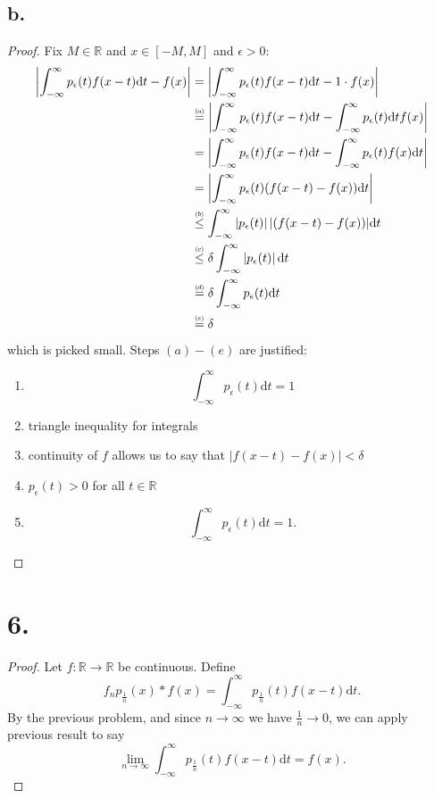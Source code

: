 \documentclass{article}
\newcommand\numeq[1]%
  {\stackrel{\scriptscriptstyle(\mkern-1.5mu#1\mkern-1.5mu)}{=}}
\newcommand\numleq[1]
  {\stackrel{\scriptscriptstyle(\mkern-1.5mu#1\mkern-1.5mu)}{\leq}}
\begin{document}
\subsection*{b.}
\begin{proof}
  Fix $M \in \mathbb{R}$ and $x \in [-M, M]$ and $\epsilon > 0$:
  \begin{align*}
    \left|\int_{-\infty}^{\infty}p_{\epsilon}(t)f(x - t)\mathrm{d}t - f(x) \right| &= \left|\int_{-\infty}^{\infty}p_{\epsilon}(t)f(x - t)\mathrm{d}t - 1 \cdot f(x) \right| \\
    &\numeq{a} \left|\int_{-\infty}^{\infty}p_{\epsilon}(t)f(x - t)\mathrm{d}t - \int_{-\infty}^{\infty}p_{\epsilon}(t)\mathrm{d}t f(x) \right|\\
    &= \left|\int_{-\infty}^{\infty}p_{\epsilon}(t)f(x - t)\mathrm{d}t - \int_{-\infty}^{\infty}p_{\epsilon}(t)f(x)\mathrm{d}t \right| \\
    &= \left|\int_{-\infty}^{\infty}p_{\epsilon}(t)(f(x - t) - f(x))\mathrm{d}t \right| \\
    &\numleq{b}\int_{-\infty}^{\infty}\left|p_{\epsilon}(t)\right||(f(x - t) - f(x))|\mathrm{d}t\\
    &\numleq{c}\delta \int_{-\infty}^{\infty}\left|p_{\epsilon}(t)\right|\mathrm{d}t \\
    &\numeq{d} \delta \int_{-\infty}^{\infty}p_{\epsilon}(t)\mathrm{d}t \\
    &\numeq{e}\delta
  \end{align*}
  which is picked small. Steps $(a)-(e)$ are justified:
  \begin{enumerate}[\indent(a)]
    \item \[
    \int_{-\infty}^{\infty}p_{\epsilon}(t) \mathrm{d}t = 1  
    \]
    \item triangle inequality for integrals
    \item continuity of $f$ allows us to say that $|f(x - t) - f(x)| < \delta$
    \item $p_{\epsilon}(t) > 0$ for all $t \in \mathbb{R}$
    \item \[
      \int_{-\infty}^{\infty}p_{\epsilon}(t) \mathrm{d}t = 1.
    \]
  \end{enumerate}
\end{proof}
\section*{6.}
\begin{proof}
  Let $f:\mathbb{R} \to \mathbb{R}$ be continuous. Define 
  \[
  f_n p_{\frac{1}{n}}(x)*f(x) = \int_{-\infty}^{\infty}p_{\frac{1}{n}}(t)f(x - t)\mathrm{d}t.   
  \]
  By the previous problem, and since $n \to \infty$ we have $\frac{1}{n} \to 0$, we can apply previous result to say 
  \[
  \lim\limits_{n \to \infty}\int_{-\infty}^{\infty}p_{\frac{1}{n}}(t)f(x - t)\mathrm{d}t = f(x).   
  \]
\end{proof}
\end{document}
